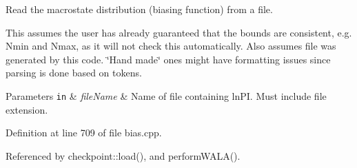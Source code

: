 Read the macrostate distribution (biasing function) from a file. 

This assumes the user has already guaranteed that the bounds are consistent, e.\-g. Nmin and Nmax, as it will not check this automatically. Also assumes file was generated by this code. \char`\"{}\-Hand made\char`\"{} ones might have formatting issues since parsing is done based on tokens.


\begin{DoxyParams}[1]{Parameters}
\mbox{\tt in}  & {\em file\-Name} & Name of file containing ln\-P\-I. Must include file extension. \\
\hline
\end{DoxyParams}


Definition at line 709 of file bias.\-cpp.



Referenced by checkpoint\-::load(), and perform\-W\-A\-L\-A().


